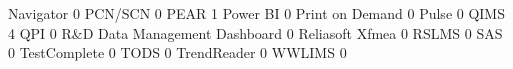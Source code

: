 \documentclass{article}
\begin{document}
\begin{Schunk}
\begin{Soutput}
  Navigator                                                            0
  PCN/SCN                                                              0
  PEAR                                                                 1
  Power BI                                                             0
  Print on Demand                                                      0
  Pulse                                                                0
  QIMS                                                                 4
  QPI                                                                  0
  R&D Data Management Dashboard                                        0
  Reliasoft Xfmea                                                      0
  RSLMS                                                                0
  SAS                                                                  0
  TestComplete                                                         0
  TODS                                                                 0
  TrendReader                                                          0
  WWLIMS                                                               0
                                                           

\end{Soutput}
\end{Schunk}
\end{document}
